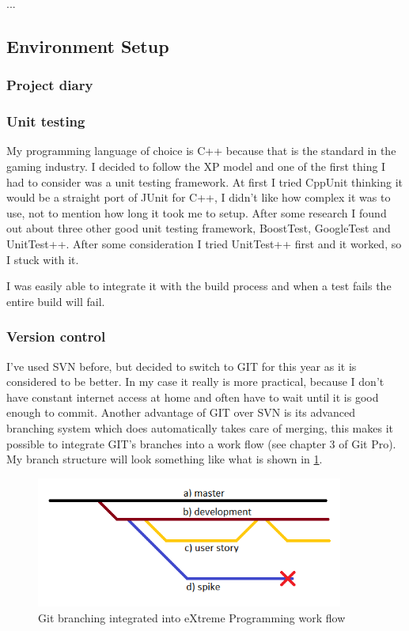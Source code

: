 \documentclass[11pt,fleqn,twoside]{article}
\begin{document}
...


\subsection{Environment Setup}


\subsubsection{Project diary}

\subsubsection{Unit testing}
My programming language of choice is C++ because that is the standard in the gaming industry. I decided to follow the XP model and one of the first thing I had to consider was a unit testing framework. At first I tried CppUnit thinking it would be a straight port of JUnit for C++, I didn't like how complex it was to use, not to mention how long it took me to setup. After some research I found out about three other good unit testing framework, BoostTest, GoogleTest and UnitTest++. After some consideration I tried UnitTest++ first and it worked, so I stuck with it.

I was easily able to integrate it with the build process and when a test fails the entire build will fail.

\subsubsection{Version control}
I've used SVN before, but decided to switch to GIT for this year as it is considered to be better. In my case it really is more practical, because I don't have constant internet access at home and often have to wait until it is good enough to commit. Another advantage of GIT over SVN is its advanced branching system which does automatically takes care of merging, this makes it possible to integrate GIT's branches into a work flow (see chapter 3 of Git Pro\cite{ProGit}). My branch structure will look something like what is shown in \ref{fig:gitXPbranches}.

\begin{figure}[h]
\centering
\includegraphics[width=0.9\textwidth]{git-XP-branches}
\caption{Git branching integrated into eXtreme Programming work flow}
\label{fig:gitXPbranches}
\end{figure}
\end{document}
